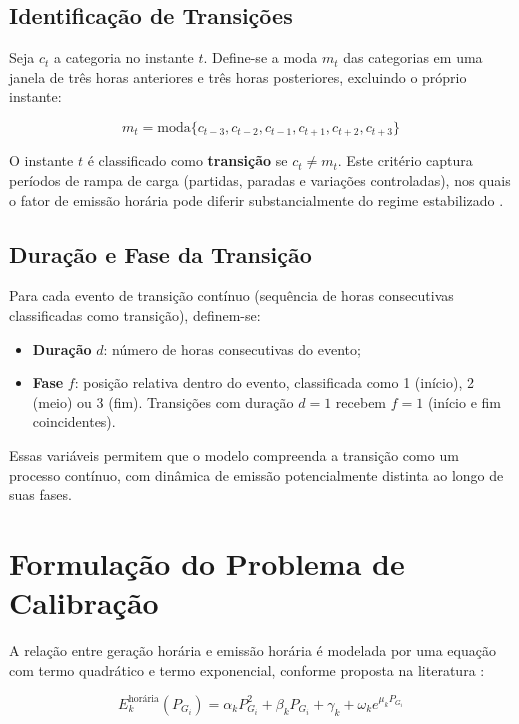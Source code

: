 \subsection{Identificação de Transições}

Seja \(c_t\) a categoria no instante \(t\). Define-se a moda \(m_t\) das categorias em uma janela de três horas anteriores e três horas posteriores, excluindo o próprio instante:

\begin{equation}
m_t = \text{moda}\{c_{t-3}, c_{t-2}, c_{t-1}, c_{t+1}, c_{t+2}, c_{t+3}\}
\label{eq:transicao}
\end{equation}

O instante \(t\) é classificado como \textbf{transição} se \(c_t \neq m_t\). Este critério captura períodos de rampa de carga (partidas, paradas e variações controladas), nos quais o fator de emissão horária pode diferir substancialmente do regime estabilizado \cite{kumar2012}.

\subsection{Duração e Fase da Transição}

Para cada evento de transição contínuo (sequência de horas consecutivas classificadas como transição), definem-se:
\begin{itemize}
    \item \textbf{Duração} \(d\): número de horas consecutivas do evento;
    \item \textbf{Fase} \(f\): posição relativa dentro do evento, classificada como 1 (início), 2 (meio) ou 3 (fim). Transições com duração \(d = 1\) recebem \(f = 1\) (início e fim coincidentes).
\end{itemize}

Essas variáveis permitem que o modelo compreenda a transição como um processo contínuo, com dinâmica de emissão potencialmente distinta ao longo de suas fases.

\section{Formulação do Problema de Calibração}

A relação entre geração horária e emissão horária é modelada por uma equação com termo quadrático e termo exponencial, conforme proposta na literatura \cite{gent1971minimum, talaq1994summary}:

\begin{equation}
E_k^{\text{horária}}(P_{G_i}) = \alpha_k P_{G_i}^2 + \beta_k P_{G_i} + \gamma_k + \omega_k e^{\mu_k P_{G_i}}
\label{eq:emissao_horaria}
\end{equation}

